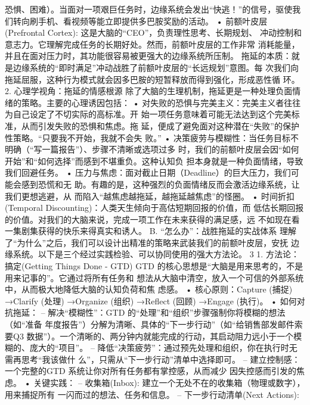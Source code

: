 \documentclass[a4paper,12pt]{article}
\begin{document}
\begin{multicols}{2}
    恐惧、困难）。当面对一项艰巨任务时，边缘系统会发出``快逃！''的信号，驱使我
    们转向刷手机、看视频等能立即提供多巴胺奖励的活动。 •
    前额叶皮层(Prefrontal Cortex):
    这是大脑的``CEO''，负责理性思考、长期规划、
    冲动控制和意志力。它理解完成任务的长期好处。然而，前额叶皮层的工作非常
    消耗能量，并且在面对压力时，其功能很容易被更强大的边缘系统所压制。
    拖延的本质：就是边缘系统的``即时满足''冲动战胜了前额叶皮层的``长远规划''意图。每
    次我们向拖延屈服，这种行为模式就会因多巴胺的短暂释放而得到强化，形成恶性循
    环。 2. 心理学视角：拖延的情感根源
    除了大脑的生理机制，拖延更是一种处理负面情绪的策略。主要的心理诱因包括：
    •
    对失败的恐惧与完美主义：完美主义者往往为自己设定了不切实际的高标准。开
    始一项任务意味着可能无法达到这个完美标准，从而引发失败的恐惧和焦虑。拖
    延，便成了避免面对这种潜在``失败''的保护性策略。``只要我不开始，我就不会失
    败。'' •
    决策疲劳与模糊性：当任务目标不明确（``写一篇报告''）、步骤不清晰或选项过多
    时，我们的前额叶皮层会因``如何开始''和``如何选择''而感到不堪重负。这种认知负
    担本身就是一种负面情绪，导致我们回避任务。 •
    压力与焦虑：面对截止日期（Deadline）的巨大压力，我们可能会感到恐慌和无
    助。有趣的是，这种强烈的负面情绪反而会激活边缘系统，让我们更想逃避，从
    而陷入``越焦虑越拖延，越拖延越焦虑''的怪圈。 • 时间折扣(Temporal
    Discounting)：人类天生倾向于高估短期回报的价值，而
    低估长期回报的价值。对我们的大脑来说，完成一项工作在未来获得的满足感，远
    不如现在看一集剧集获得的快乐来得真实和诱人。 B.
    ``怎么办''：战胜拖延的实战体系
    理解了``为什么''之后，我们可以设计出精准的策略来武装我们的前额叶皮层，安抚
    边缘系统。以下是三个经过实践检验、可以协同使用的强大方法论。 3 1.
    方法论：搞定(Getting Things Done - GTD) GTD
    的核心思想是``大脑是用来思考的，不是用来记事的''。它通过将所有任务和
    想法从大脑中清空，放入一个可信的外部系统中，从而极大地降低大脑的认知负荷和焦
    虑感。 • 核心原则：Capture (捕捉) →Clarify (处理) →Organize (组织)
    →Reflect (回顾) →Engage (执行)。 • 如何对抗拖延： --
    解决``模糊性''：GTD
    的``处理''和``组织''步骤强制你将模糊的想法（如``准备
    年度报告''）分解为清晰、具体的``下一步行动''（如``给销售部发邮件索要Q3
    数据''）。一个清晰的、两分钟内就能完成的行动，其启动阻力远小于一个模
    糊的、庞大的``项目''。 --
    降低``决策疲劳''：通过预先处理和组织，你在执行时无需再思考``我该做什
    么''，只需从``下一步行动''清单中选择即可。 --
    建立控制感：一个完整的GTD 系统让你对所有任务都有掌控感，从而减少
    因失控感而引发的焦虑。 • 关键实践： -- 收集箱(Inbox):
    建立一个无处不在的收集箱（物理或数字），用来捕捉所有
    一闪而过的想法、任务和信息。 -- 下一步行动清单(Next Actions):

\end{multicols}
\end{document}
